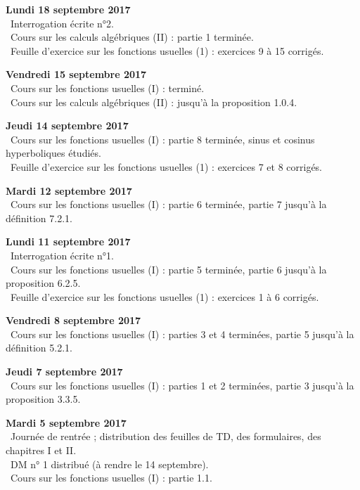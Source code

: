 \documentclass[12pt,a4paper]{article}
\begin{document}
\noindent\textbf{Lundi 18 septembre 2017}\\
\bu\ Interrogation écrite n°2.\\
\bu\ Cours sur les calculs algébriques (II) : partie 1 terminée. \\
\bu\ Feuille d'exercice sur les fonctions usuelles (1) : exercices 9 à 15 corrigés. \\
\vspace{.4cm}

\noindent\textbf{Vendredi 15 septembre 2017}\\
\bu\ Cours sur les fonctions usuelles (I) : terminé. \\
\bu\ Cours sur les calculs algébriques (II) : jusqu'à la proposition 1.0.4. \\
\vspace{.4cm}

\noindent\textbf{Jeudi 14 septembre 2017}\\
\bu\ Cours sur les fonctions usuelles (I) : partie 8 terminée, sinus et cosinus hyperboliques étudiés. \\
\bu\ Feuille d'exercice sur les fonctions usuelles (1) : exercices 7 et 8 corrigés. \\
\vspace{.4cm}

\noindent\textbf{Mardi 12 septembre 2017}\\
\bu\ Cours sur les fonctions usuelles (I) : partie 6 terminée, partie 7 jusqu'à la définition 7.2.1. \\
\vspace{.4cm}

\noindent\textbf{Lundi 11 septembre 2017}\\
\bu\ Interrogation écrite n°1. \\
\bu\ Cours sur les fonctions usuelles (I) : partie 5 terminée, partie 6 jusqu'à la proposition 6.2.5. \\
\bu\ Feuille d'exercice sur les fonctions usuelles (1) : exercices 1 à 6 corrigés. \\
\vspace{.4cm}

\noindent\textbf{Vendredi 8 septembre 2017}\\
\bu\ Cours sur les fonctions usuelles (I) : parties 3 et 4 terminées, partie 5 jusqu'à la définition 5.2.1. \\
\vspace{.4cm}

\noindent\textbf{Jeudi 7 septembre 2017}\\
\bu\ Cours sur les fonctions usuelles (I) : parties 1 et 2 terminées, partie 3 jusqu'à la proposition 3.3.5. \\
\vspace{.4cm}

\noindent\textbf{Mardi 5 septembre 2017}\\
\bu\ Journée de rentrée ; distribution des feuilles de TD, des formulaires, des
chapitres I et II.  \\
\bu\ DM n° 1 distribué (à rendre le 14 septembre). \\
\bu\ Cours sur les fonctions usuelles (I) : partie 1.1. \\
\vspace{.4cm}


\label{end}
\end{document}
